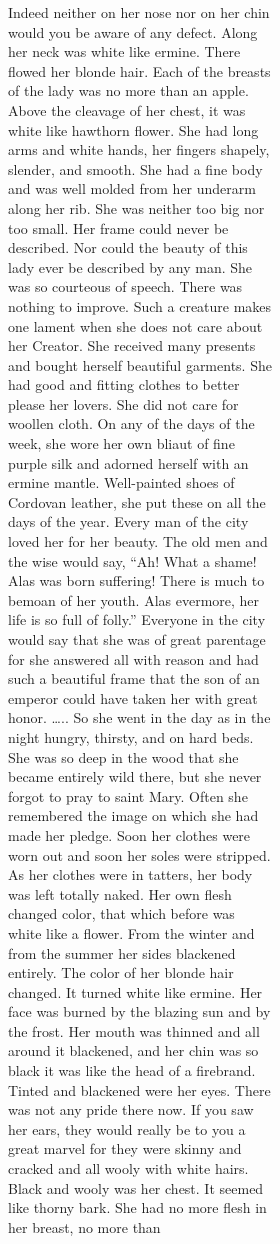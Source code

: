 \documentclass[
  letterpaper,
  DIV=11,
  numbers=noendperiod,
  oneside]{scrreprt}
\begin{document}
\begin{figure}
\begin{figure}
\begin{figure}
\begin{minipage}{0.20\linewidth}
{Indeed neither} on her nose {nor} on her chin would you be aware of
{any} defect. Along her neck was {white like ermine.} There flowed her
{blonde} hair. Each of the breasts of the lady was {no more} than an
apple. Above the cleavage of her chest, it was {white like hawthorn
flower.} She had {long arms} and {white hands}, her fingers shapely,
slender, and smooth. She had a fine body and was well molded from her
underarm along her rib. {She was neither too big nor too small.} Her
frame could {never} be described. {Nor} could the beauty of this lady
{ever} be described by {any} man. She was so courteous of speech. There
was {nothing} to improve. Such a creature makes one lament when she
{does not} care about her Creator. She received many presents and bought
herself beautiful garments. She had good and fitting clothes to better
please her lovers. She {did not} care for woollen cloth. On any of the
days of the week, she wore her own bliaut of fine {purple silk} and
adorned herself with an ermine mantle. {Well-painted} shoes of Cordovan
leather, she put these on all the days of the year. Every man of the
city loved her for her beauty. The old men and the wise would say, ``Ah!
What a shame! Alas was born suffering! There is much to bemoan of her
youth. Alas evermore, her life is so full of folly.'' Everyone in the
city would say that she was of great parentage for she answered all with
reason and had such a beautiful frame that the son of an emperor could
have taken her with great honor. \ldots.. So she went in the day as in
the night hungry, thirsty, and on hard beds. She was so deep in the wood
that she became entirely wild there, but she {never} forgot to pray to
saint Mary. Often she remembered the image on which she had made her
pledge. Soon her clothes were worn out and soon her soles were stripped.
As her clothes were in tatters, her body was left totally naked. Her own
flesh {changed color,} that which before was {white like a flower.} From
the winter and from the summer her sides {blackened} entirely. {The
color of her blonde hair changed.} {It turned white like ermine.} Her
face was {burned} by the blazing sun and by the frost. Her mouth was
thinned and all around it {blackened,} and her chin was so {black} {it
was like the head of a firebrand.} {Tinted and blackened} were her eyes.
There was not any pride there now. If you saw her ears, they would
really be to you a great marvel for they were skinny and cracked and all
wooly with {white} hairs. {Black} and wooly was her chest. It seemed
like thorny bark. She had {no more} flesh in her breast, {no more} than

\end{minipage}
\end{figure}
\end{figure}
\end{figure}
\end{document}
